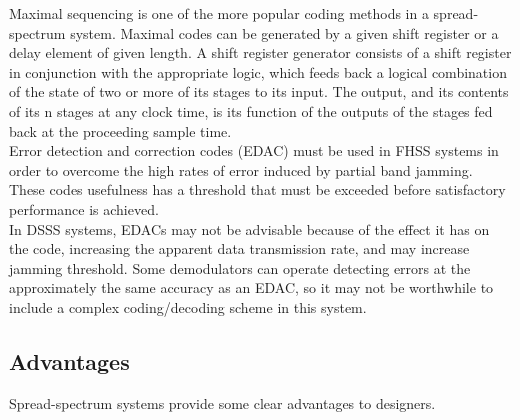 \documentclass[12pt, a4paper,twoside]{tesi_upf}
\begin{document}
Maximal sequencing is one of the more popular coding methods in a spread-spectrum system. Maximal codes can be generated by a given shift register or a delay element of given length.
A shift register generator consists of a shift register in conjunction with the appropriate logic, which feeds back a logical combination of the state of two or more of its stages to its input. The output, and its contents of its n stages at any clock time, is its function of the outputs of the stages fed back at the proceeding sample time.
\\[12pt]

Error detection and correction codes (EDAC) must be used in FHSS systems in order to overcome the high rates of error induced by partial band jamming. These codes usefulness has a threshold that must be exceeded before satisfactory performance is achieved.
\\[12pt]

In DSSS systems, EDACs may not be advisable because of the effect it has on the code, increasing the apparent data transmission rate, and may increase jamming threshold. Some demodulators can operate detecting errors at the approximately the same accuracy as an EDAC, so it may not be worthwhile to include a complex coding/decoding scheme in this system.
\\[12pt]

\subsection{Advantages}
 
Spread-spectrum systems provide some clear advantages to designers.
\end{document}
